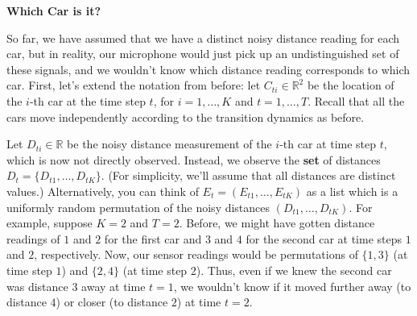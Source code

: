 \item {\bf Which Car is it?}

So far, we have assumed that we have a distinct noisy distance reading for each
car, but in reality, our microphone would just pick up an undistinguished set of
these signals, and we wouldn't know which distance reading corresponds to which
car. First, let's extend the notation from before: let $C_{ti} \in \mathbb R^2$
be the location of the $i$-th car at the time step $t$, for $i = 1, \dots, K$
and $t = 1, \dots, T$. Recall that all the cars move independently according to
the transition dynamics as before.

Let $D_{ti} \in \mathbb R$ be the noisy distance measurement of the $i$-th car
at time step $t$, which is now not directly observed. Instead, we observe the
{\bf set} of distances $D_t = \{ D_{t1}, \dots, D_{tK} \}$.  (For simplicity,
we'll assume that all distances are distinct values.) Alternatively, you can
think of $E_t = (E_{t1}, \dots, E_{tK})$ as a list which is a uniformly random
permutation of the noisy distances $(D_{t1}, \dots, D_{tK})$. For example,
suppose $K=2$ and $T = 2$. Before, we might have gotten distance readings of $1$
and $2$ for the first car and $3$ and $4$ for the second car at time steps $1$
and $2$, respectively. Now, our sensor readings would be permutations of $\{1,
3\}$ (at time step $1$) and $\{2, 4\}$ (at time step $2$). Thus, even if we knew
the second car was distance $3$ away at time $t = 1$, we wouldn't know if it
moved further away (to distance $4$) or closer (to distance $2$) at time $t =
2$.

\begin{enumerate}

  

  

  

  

\end{enumerate}
